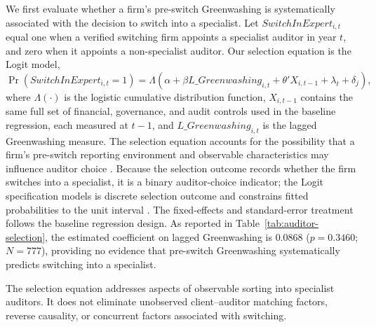 \documentclass[11pt]{article}
\begin{document}
We first evaluate whether a firm's pre-switch Greenwashing is systematically associated with the decision to switch into a specialist. 
Let \(SwitchInExpert_{i,t}\) equal one when a verified switching firm appoints a specialist auditor in year \(t\), and zero when it appoints a non-specialist auditor. 
Our selection equation is the Logit model,
\[
\Pr(SwitchInExpert_{i,t}=1)=\Lambda\left(\alpha+\beta L\_Greenwashing_{i,t}+\theta'X_{i,t-1}+\lambda_t+\delta_j\right),
\]
where \(\Lambda(\cdot)\) is the logistic cumulative distribution function, \(X_{i,t-1}\) contains the same full set of financial, governance, and audit controls used in the baseline regression, each measured at \(t-1\), and \(L\_Greenwashing_{i,t}\) is the lagged Greenwashing measure. 
The selection equation accounts for the possibility that a firm's pre-switch reporting environment and observable characteristics may influence auditor choice \citep{defondsubramanyam1998}. 
Because the selection outcome records whether the firm switches into a specialist, it is a binary auditor-choice indicator; the Logit specification models is discrete selection outcome and constrains fitted probabilities to the unit interval \citep{wooldridge2010econometric}. 
The fixed-effects and standard-error treatment follows the baseline regression design.
As reported in Table~\ref{tab:auditor-selection}, the estimated coefficient on lagged Greenwashing is \(0.0868\) (\(p=0.3460\); \(N=777\)), providing no evidence that pre-switch Greenwashing systematically predicts switching into a specialist. 

The selection equation addresses aspects of observable sorting into specialist auditors. 
It does not eliminate unobserved client--auditor matching factors, reverse causality, or concurrent factors associated with switching. 
\end{document}
